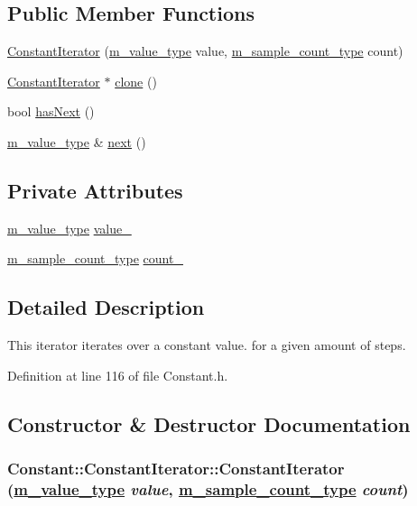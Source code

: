 \subsection*{Public Member Functions}
\begin{CompactItemize}
\item 
\hyperlink{classConstant_1_1ConstantIterator_a0}{Constant\-Iterator} (\hyperlink{Types_8h_a3}{m\_\-value\_\-type} value, \hyperlink{Types_8h_a1}{m\_\-sample\_\-count\_\-type} count)
\item 
\hyperlink{classConstant_1_1ConstantIterator}{Constant\-Iterator} $\ast$ \hyperlink{classConstant_1_1ConstantIterator_a1}{clone} ()
\item 
bool \hyperlink{classConstant_1_1ConstantIterator_a2}{has\-Next} ()
\item 
\hyperlink{Types_8h_a3}{m\_\-value\_\-type} \& \hyperlink{classConstant_1_1ConstantIterator_a3}{next} ()
\end{CompactItemize}
\subsection*{Private Attributes}
\begin{CompactItemize}
\item 
\hyperlink{Types_8h_a3}{m\_\-value\_\-type} \hyperlink{classConstant_1_1ConstantIterator_r0}{value\_\-}
\item 
\hyperlink{Types_8h_a1}{m\_\-sample\_\-count\_\-type} \hyperlink{classConstant_1_1ConstantIterator_r1}{count\_\-}
\end{CompactItemize}


\subsection{Detailed Description}
This iterator iterates over a constant value. for a given amount of steps. 



Definition at line 116 of file Constant.h.

\subsection{Constructor \& Destructor Documentation}
\hypertarget{classConstant_1_1ConstantIterator_a0}{
\subsubsection[ConstantIterator]{\setlength{\rightskip}{0pt plus 5cm}Constant::Constant\-Iterator::Constant\-Iterator (\hyperlink{Types_8h_a3}{m\_\-value\_\-type} {\em value}, \hyperlink{Types_8h_a1}{m\_\-sample\_\-count\_\-type} {\em count})}}
\label{classConstant_1_1ConstantIterator_a0}


